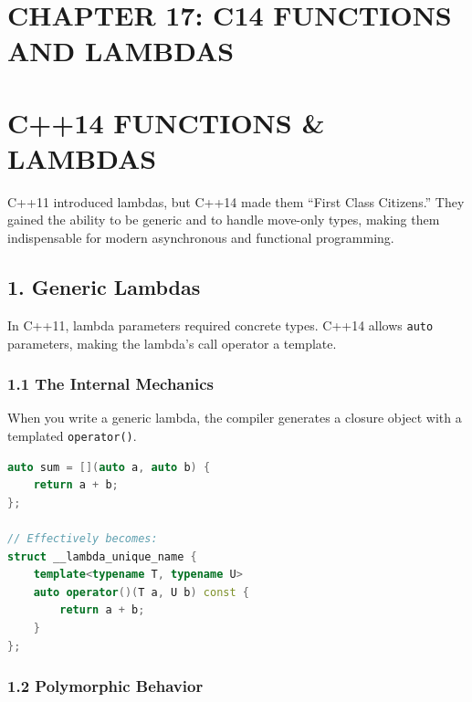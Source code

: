 \hypertarget{chapter-17-c14-functions-and-lambdas}{%
\section{CHAPTER 17: C14 FUNCTIONS AND
LAMBDAS}\label{chapter-17-c14-functions-and-lambdas}}

\hypertarget{c14-functions-lambdas}{%
\section{C++14 FUNCTIONS \& LAMBDAS}\label{c14-functions-lambdas}}

C++11 introduced lambdas, but C++14 made them ``First Class Citizens.''
They gained the ability to be generic and to handle move-only types,
making them indispensable for modern asynchronous and functional
programming.

\hypertarget{generic-lambdas}{%
\subsection{1. Generic Lambdas}\label{generic-lambdas}}

In C++11, lambda parameters required concrete types. C++14 allows
\passthrough{\lstinline!auto!} parameters, making the lambda's call
operator a template.

\hypertarget{the-internal-mechanics}{%
\subsubsection{1.1 The Internal
Mechanics}\label{the-internal-mechanics}}

When you write a generic lambda, the compiler generates a closure object
with a templated \passthrough{\lstinline!operator()!}.

\begin{lstlisting}[language={C++}]
auto sum = [](auto a, auto b) {
    return a + b;
};

// Effectively becomes:
struct __lambda_unique_name {
    template<typename T, typename U>
    auto operator()(T a, U b) const {
        return a + b;
    }
};
\end{lstlisting}

\hypertarget{polymorphic-behavior}{%
\subsubsection{1.2 Polymorphic Behavior}\label{polymorphic-behavior}}

